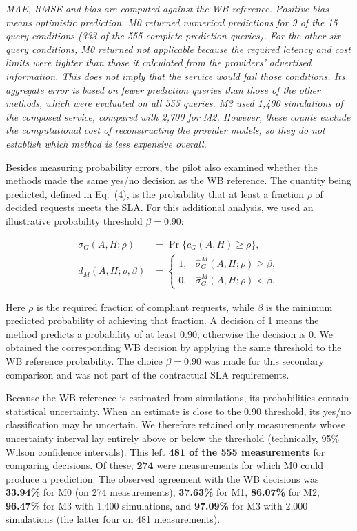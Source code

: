 \documentclass[10pt,a4paper]{article}
\begin{document}
\emph{MAE, RMSE and bias are computed against the WB reference. Positive bias means optimistic prediction. M0 returned numerical predictions for 9 of the 15 query conditions (333 of the 555 complete prediction queries). For the other six query conditions, M0 returned not applicable because the required latency and cost limits were tighter than those it calculated from the providers' advertised information. This does not imply that the service would fail those conditions. Its aggregate error is based on fewer prediction queries than those of the other methods, which were evaluated on all 555 queries. M3 used 1,400 simulations of the composed service, compared with 2,700 for M2. However, these counts exclude the computational cost of reconstructing the provider models, so they do not establish which method is less expensive overall.}

Besides measuring probability errors, the pilot also examined whether the methods made the same yes/no decision as the WB reference. The quantity being predicted, defined in Eq.~(4), is the probability that at least a fraction $\rho$ of decided requests meets the SLA. For this additional analysis, we used an illustrative probability threshold $\beta=0.90$:

\begin{equation*}
\begin{aligned}
\sigma_G(A,H;\rho)
&=\Pr\{c_G(A,H)\ge\rho\},\\[3pt]
d_M(A,H;\rho,\beta)
&=
\begin{cases}
1, & \widehat{\sigma}_G^M(A,H;\rho)\ge\beta,\\
0, & \widehat{\sigma}_G^M(A,H;\rho)<\beta.
\end{cases}
\end{aligned}
\end{equation*}

Here $\rho$ is the required fraction of compliant requests, while $\beta$ is the minimum predicted probability of achieving that fraction. A decision of 1 means the method predicts a probability of at least 0.90; otherwise the decision is 0. We obtained the corresponding WB decision by applying the same threshold to the WB reference probability. The choice $\beta=0.90$ was made for this secondary comparison and was not part of the contractual SLA requirements.

Because the WB reference is estimated from simulations, its probabilities contain statistical uncertainty. When an estimate is close to the 0.90 threshold, its yes/no classification may be uncertain. We therefore retained only measurements whose uncertainty interval lay entirely above or below the threshold (technically, 95\% Wilson confidence intervals). This left \textbf{481 of the 555 measurements} for comparing decisions. Of these, \textbf{274} were measurements for which M0 could produce a prediction. The observed agreement with the WB decisions was \textbf{33.94\%} for M0 (on 274 measurements), \textbf{37.63\%} for M1, \textbf{86.07\%} for M2, \textbf{96.47\%} for M3 with 1,400 simulations, and \textbf{97.09\%} for M3 with 2,000 simulations (the latter four on 481 measurements).
\end{document}
